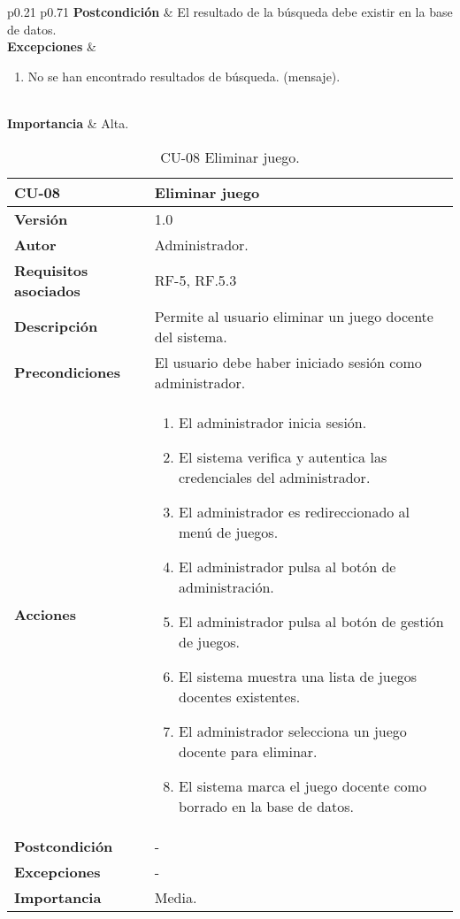 \begin{table}[h!]
\begin{tabularx}{\linewidth}{ p{0.21\columnwidth} p{0.71\columnwidth} }
         \textbf{Postcondición}             & El resultado de la búsqueda debe existir en la base de datos. \\
		\textbf{Excepciones}             &
		\begin{enumerate}
			\def\labelenumi{\arabic{enumi}.}
			\tightlist
			\item No se han encontrado resultados de búsqueda. (mensaje).
		\end{enumerate}\\
		\textbf{Importancia}          & Alta. \\
		\bottomrule
	\end{tabularx}
	\caption{CU-07 Ver menú juegos administrador.}
\end{table}

\begin{table}[h!]
	\centering
	\begin{tabularx}{\linewidth}{ p{} p{} }
		\toprule
		\textbf{CU-08}    & \textbf{Eliminar juego}\\
		\toprule
		\textbf{Versión}              & 1.0    \\
		\textbf{Autor}                & Administrador. \\
		\textbf{Requisitos asociados} & RF-5, RF.5.3 \\
		\textbf{Descripción}          & Permite al usuario eliminar un juego docente del sistema.\\
		\textbf{Precondiciones}         & El usuario debe haber iniciado sesión como administrador. \\
		\textbf{Acciones}             &
		\begin{enumerate}
			\def\labelenumi{\arabic{enumi}.}
			\tightlist
			\item El administrador inicia sesión.
            \item El sistema verifica y autentica las credenciales del administrador.
            \item El administrador es redireccionado al menú de juegos.
            \item El administrador pulsa al botón de administración.
            \item El administrador pulsa al botón de gestión de juegos.
            \item El sistema muestra una lista de juegos docentes existentes.
    	\item El administrador selecciona un juego docente para eliminar.
    	\item El sistema marca el juego docente como borrado en la base de datos.
		\end{enumerate}\\
         \textbf{Postcondición}             & - \\
		\textbf{Excepciones}             & - \\
		\textbf{Importancia}          & Media. \\
		\bottomrule
	\end{tabularx}
	\caption{CU-08 Eliminar juego.}
\end{table}

